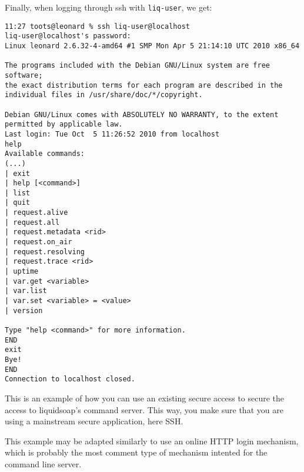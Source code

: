 Finally, when logging through ssh with \verb+liq-user+, we get:

\begin{verbatim}
11:27 toots@leonard % ssh liq-user@localhost
liq-user@localhost's password: 
Linux leonard 2.6.32-4-amd64 #1 SMP Mon Apr 5 21:14:10 UTC 2010 x86_64

The programs included with the Debian GNU/Linux system are free software;
the exact distribution terms for each program are described in the
individual files in /usr/share/doc/*/copyright.

Debian GNU/Linux comes with ABSOLUTELY NO WARRANTY, to the extent
permitted by applicable law.
Last login: Tue Oct  5 11:26:52 2010 from localhost
help
Available commands:
(...)
| exit
| help [<command>]
| list
| quit
| request.alive
| request.all
| request.metadata <rid>
| request.on_air
| request.resolving
| request.trace <rid>
| uptime
| var.get <variable>
| var.list
| var.set <variable> = <value>
| version

Type "help <command>" for more information.
END
exit
Bye!
END
Connection to localhost closed.
\end{verbatim}
This is an example of how you can use an existing secure access to 
secure the access to liquidsoap's command server. This way, you make sure
that you are using a mainstream secure application, here SSH.

This example may be adapted similarly to use an online HTTP login 
mechanism, which is probably the most comment type of mechanism
intented for the command line server.

